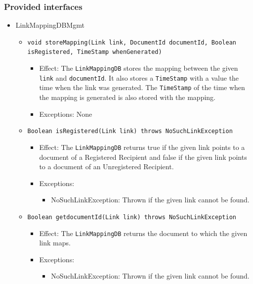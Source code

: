 \documentclass[a4paper,10pt]{article}
\begin{document}
\subsubsection*{Provided interfaces}
\begin{itemize}
    \item LinkMappingDBMgmt
    \begin{itemize}
        
		\item \texttt{void storeMapping(Link link, DocumentId documentId, Boolean isRegistered, TimeStamp whenGenerated)}
		 \begin{itemize}
            \item Effect: The \texttt{LinkMappingDB} stores the mapping between the given \texttt{link} and \texttt{documentId}. It also stores a \texttt{TimeStamp} with a value the time when the link was generated. The \texttt{TimeStamp} of the time when the mapping is generated is also stored with the mapping.
            \item Exceptions: None
		\end{itemize}        
        
		\item \texttt{Boolean isRegistered(Link link) throws NoSuchLinkException}
		 \begin{itemize}
            \item Effect: The \texttt{LinkMappingDB} returns true if the given link points to a document of a Registered Recipient and false if the given link points to a document of an Unregistered Recipient.
            \item Exceptions: 
            \begin{itemize}
            	\item NoSuchLinkException: Thrown if  the given link cannot be found.
            \end{itemize}
		\end{itemize}   
		
		\item \texttt{Boolean getdocumentId(Link link) throws NoSuchLinkException}
		 \begin{itemize}
            \item Effect: The \texttt{LinkMappingDB} returns the document to which the given link maps.
            \item Exceptions: 
            \begin{itemize}
            	\item NoSuchLinkException: Thrown if the given link cannot be found.
            \end{itemize}
		\end{itemize}  		     


\end{itemize}
\end{itemize}
\end{document}
